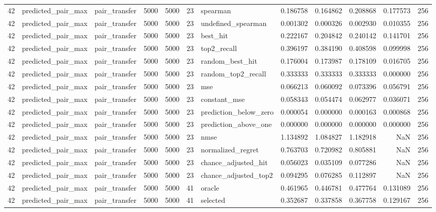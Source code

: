 \begin{tabular}{rllrrrlrrrrr}
42 & predicted_pair_max & pair_transfer & 5000 & 5000 & 23 & spearman & 0.186758 & 0.164862 & 0.208868 & 0.177573 & 256 \\
42 & predicted_pair_max & pair_transfer & 5000 & 5000 & 23 & undefined_spearman & 0.001302 & 0.000326 & 0.002930 & 0.010355 & 256 \\
42 & predicted_pair_max & pair_transfer & 5000 & 5000 & 23 & best_hit & 0.222167 & 0.204842 & 0.240142 & 0.141701 & 256 \\
42 & predicted_pair_max & pair_transfer & 5000 & 5000 & 23 & top2_recall & 0.396197 & 0.384190 & 0.408598 & 0.099998 & 256 \\
42 & predicted_pair_max & pair_transfer & 5000 & 5000 & 23 & random_best_hit & 0.176004 & 0.173987 & 0.178109 & 0.016705 & 256 \\
42 & predicted_pair_max & pair_transfer & 5000 & 5000 & 23 & random_top2_recall & 0.333333 & 0.333333 & 0.333333 & 0.000000 & 256 \\
42 & predicted_pair_max & pair_transfer & 5000 & 5000 & 23 & mse & 0.066213 & 0.060092 & 0.073396 & 0.056791 & 256 \\
42 & predicted_pair_max & pair_transfer & 5000 & 5000 & 23 & constant_mse & 0.058343 & 0.054474 & 0.062977 & 0.036071 & 256 \\
42 & predicted_pair_max & pair_transfer & 5000 & 5000 & 23 & prediction_below_zero & 0.000054 & 0.000000 & 0.000163 & 0.000868 & 256 \\
42 & predicted_pair_max & pair_transfer & 5000 & 5000 & 23 & prediction_above_one & 0.000000 & 0.000000 & 0.000000 & 0.000000 & 256 \\
42 & predicted_pair_max & pair_transfer & 5000 & 5000 & 23 & nmse & 1.134892 & 1.084827 & 1.182918 & NaN & 256 \\
42 & predicted_pair_max & pair_transfer & 5000 & 5000 & 23 & normalized_regret & 0.763703 & 0.720982 & 0.805881 & NaN & 256 \\
42 & predicted_pair_max & pair_transfer & 5000 & 5000 & 23 & chance_adjusted_hit & 0.056023 & 0.035109 & 0.077286 & NaN & 256 \\
42 & predicted_pair_max & pair_transfer & 5000 & 5000 & 23 & chance_adjusted_top2 & 0.094295 & 0.076285 & 0.112897 & NaN & 256 \\
42 & predicted_pair_max & pair_transfer & 5000 & 5000 & 41 & oracle & 0.461965 & 0.446781 & 0.477764 & 0.131089 & 256 \\
42 & predicted_pair_max & pair_transfer & 5000 & 5000 & 41 & selected & 0.352687 & 0.337858 & 0.367758 & 0.129167 & 256 \\

\end{tabular}
